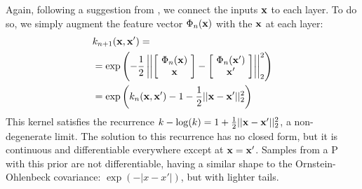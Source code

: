 \documentclass[twoside]{article}
\makeatletter
\newlength{\nonHumbleHeight}
\def\@humbleformat#1{{\settoheight{\nonHumbleHeight}{#1}\resizebox{!}{0.94\nonHumbleHeight}{#1}}}%
\def\humble#1{\@humbleformat{#1}}%
\newcommand{\gp}{{\humble GP}}
\makeatother
\begin{document}
Again, following a suggestion from \cite{neal1995bayesian}, we connect the inputs ${\bf{x}}$ to each layer.  To do so, we simply augment the feature vector $\Phi_n({\bf{x}})$ with the ${\bf{x}}$ at each layer:
%
\begin{align}
& k_{n+1}({\bf{x}}, {\bf{x}}') = \nonumber \\
& = \exp \left( -\frac{1}{2} \left|\left| \left[ \! \begin{array}{c} \Phi_n({\bf{x}}) \\ {\bf{x}} \end{array} \! \right]  - \left[ \! \begin{array}{c} \Phi_n({\bf{x}}') \\ {\bf{x}}' \end{array} \! \right] \right| \right|_2^2 \right) \nonumber \\
& = \exp \left( k_n({\bf{x}}, {\bf{x}}') - 1 -\frac{1}{2} || {\bf{x}} - {\bf{x}}' ||_2^2 \right)
\end{align}
%
%
This kernel satisfies the recurrence $k - \log(k) = 1 + \frac{1}{2} || {\bf{x}} - {\bf{x}}' ||_2^2$, a non-degenerate limit.  The solution to this recurrence has no closed form, but it is continuous and differentiable everywhere except at ${\bf{x}} = {\bf{x}}'$.
%
Samples from a \gp{} with this prior are not differentiable, having a similar shape to the Ornstein-Ohlenbeck covariance: $\exp( -|x - x'| )$, but with lighter tails.%

\end{document}
